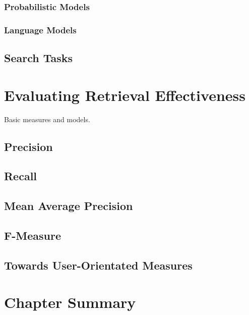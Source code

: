 \subsubsection{Probabilistic Models}

\subsubsection{Language Models}

\subsection{Search Tasks}

\section{Evaluating Retrieval Effectiveness}\label{sec:ir_background:evaluation}
Basic measures and models.

\subsection{Precision}

\subsection{Recall}

\subsection{Mean Average Precision}

\subsection{F-Measure}

\subsection{Towards User-Orientated Measures}

\section{Chapter Summary}